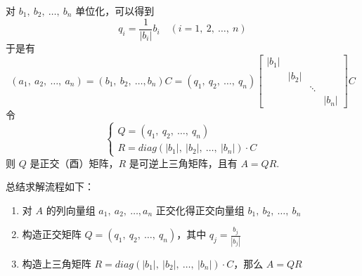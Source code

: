             对 $b_1, \ b_2, \ \dots, \ b_n$ 单位化，可以得到
            \begin{equation*}
                q_i = \frac{1}{|b_i|}b_i \quad (i = 1, \ 2, \ \dots, \ n)
            \end{equation*}
            于是有 
            \begin{equation*}
                (a_1, \ a_2, \ \dots, \ a_n) = (b_1, \ b_2, \ \dots, b_n)C = (q_1, \ q_2, \ \dots, \ q_n)\begin{bmatrix}
                    |b_1| & & & \\ & |b_2| & & \\ & & \ddots & \\ & & & |b_n|
                \end{bmatrix}C
            \end{equation*}
            令 
            \begin{equation*}
                \begin{cases*}
                    Q = (q_1, \ q_2, \ \dots, \ q_n) \\ R = diag(|b_1|, \ |b_2|, \ \dots, \ |b_n|) \cdot C
                \end{cases*}
            \end{equation*}
            则 $Q$ 是正交（酉）矩阵，$R$ 是可逆上三角矩阵，且有 $A = QR$.
            \par 总结求解流程如下：
            \begin{enumerate}
                \item 对 $A$ 的列向量组 $a_1, \ a_2, \ \dots, a_n$ 正交化得正交向量组 $b_1, \ b_2, \ \dots, \ b_n$
                \item 构造正交矩阵 $Q = (q_1, \ q_2, \ \dots, \ q_n)$，其中 $q_j = \frac{b_j}{|b_j|}$
                \item 构造上三角矩阵 $R = diag(|b_1|, \ |b_2|, \ \dots, \ |b_n|)\cdot C$，那么 $A = QR$
            \end{enumerate}

